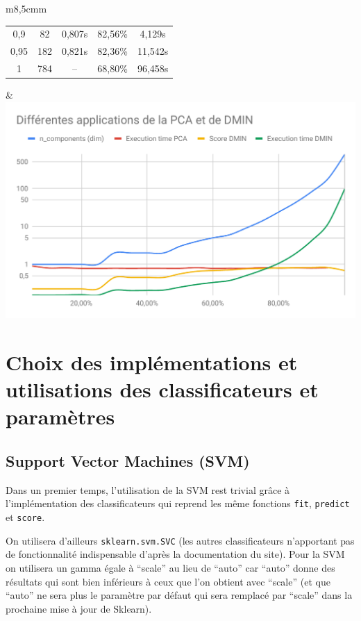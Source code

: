 \documentclass[12pt,a4paper]{article}
\begin{document}
{\begin{tabular}{m{}m{}}
\begin{tabular}{|c|c|c|c|c|}
        0,9          & 82             & 0,807s                   & 82,56\%          & 4,129s     \\
        0,95         & 182            & 0,821s                   & 82,36\%          & 11,542s    \\
        1            & 784            & --                       & 68,80\%          & 96,458s    \\
        \hline
    \end{tabular} & \includegraphics[scale=0.4]{PCA+DMIN.pdf} \\
\end{tabular}

\section{Choix des implémentations et utilisations des classificateurs et paramètres}

\subsection{Support Vector Machines (SVM)}

Dans un premier temps, l'utilisation de la SVM rest trivial grâce à l'implémentation des classificateurs qui reprend les même fonctions \lstinline[style=default]|fit|, \lstinline[style=default]|predict| et \lstinline[style=default]|score|.

On utilisera d'ailleurs \lstinline[style=default]|sklearn.svm.SVC| (les autres classificateurs n'apportant pas de fonctionnalité indispensable d'après la documentation du site).
Pour la SVM on utilisera un gamma égale à ``scale'' au lieu de ``auto'' car ``auto'' donne des résultats qui sont bien inférieurs à ceux que l'on obtient avec ``scale'' (et que ``auto'' ne sera plus le paramètre par défaut qui sera remplacé par ``scale'' dans la prochaine mise à jour de Sklearn).

}
\end{document}
